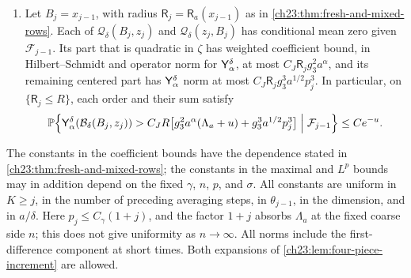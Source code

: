 \begin{theorem}
\begin{enumerate}
\begin{align*}
 \norm{\Hnorm{\sigma}{\delta}(I_aZ_j)}_p&\le C_{p,J}\bigl\{g_3^2a^\sigma(1+j)+g_3^3a^{1/2}p_j^3\bigr\},\\
 \norm{\Xnorm{\alpha}{\delta}(z_j)}_p&\le C_{p,J}\bigl\{g_3^2a^\alpha(1+j)+g_3^3a^{1/2}p_j^3\bigr\}.
\end{align*}
\item Let $B_j=x_{j-1}$, with radius $\mathsf R_j=\mathsf R_a(x_{j-1})$ as in \cref{ch23:thm:fresh-and-mixed-rows}. Each of $\mathcal Q_\delta(B_j,z_j)$ and $\mathcal Q_\delta(z_j,B_j)$ has conditional mean zero given $\mathcal F_{j-1}$. Its part that is quadratic in $\zeta$ has weighted coefficient bound, in Hilbert--Schmidt and operator norm for $\mathsf Y_{\alpha}^{\delta}$, at most $C_J\mathsf R_jg_3^2a^\alpha$, and its remaining centered part has $\mathsf Y_{\alpha}^{\delta}$ norm at most $C_J\mathsf R_jg_3^3a^{1/2}p_j^3$. In particular, on $\{\mathsf R_j\le R\}$, each order and their sum satisfy
\[
 \mathbb P\Bigl\{\mathsf Y_{\alpha}^{\delta}(\mathcal B_\delta(B_j,z_j))>C_JR\bigl[g_3^2a^\alpha(\Lambda_a+u)+g_3^3a^{1/2}p_j^3\bigr]\Bigm|\mathcal F_{j-1}\Bigr\}\le Ce^{-u}.
\]
\end{enumerate}
The constants in the coefficient bounds have the dependence stated in \cref{ch23:thm:fresh-and-mixed-rows}; the constants in the maximal and $L^p$ bounds may in addition depend on the fixed $\gamma$, $n$, $p$, and $\sigma$. All constants are uniform in $K\ge j$, in the number of preceding averaging steps, in $\theta_{j-1}$, in the dimension, and in $a/\delta$. Here $p_j\le C_\gamma(1+j)$, and the factor $1+j$ absorbs $\Lambda_a$ at the fixed coarse side $n$; this does not give uniformity as $n\to\infty$. All norms include the first-difference component at short times. Both expansions of \cref{ch23:lem:four-piece-increment} are allowed.
\end{theorem}

